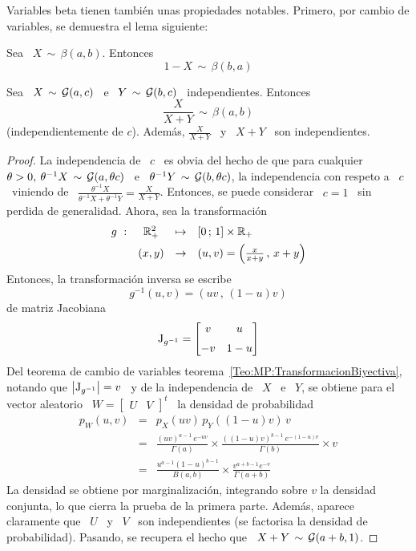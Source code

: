 Variables beta  tienen tambi\'en unas propiedades notables.  Primero, por cambio
de variables, se demuestra el lema siguiente:
%
\begin{lema}[Reflexividad]
\label{Lem:MP:ReflexividadBeta}
%
  Sea \ $X \, \sim \, \beta(a,b)$. Entonces
  \[
  1-X \, \sim \, \beta(b,a)
  \]
\end{lema}
%
\begin{lema}
\label{Lem:MP:VinculoBetaGamma}
%
  Sea  \   $X  \,  \sim  \,   \mathcal{G}(a,c)$  \  e  \   $Y  \,  \sim   \,  \mathcal{G}(b,c)$  \
  independientes. Entonces
  \[
  \frac{X}{X+Y} \, \sim \, \beta(a,b)
  \]
  (independientemente  de $c$).   Adem\'as, $\frac{X}{X+Y}$  \ y  \ $X+Y$  \ son
  independientes.
\end{lema}
%
\begin{proof}
  La independencia de \ $c$ \ es obvia del hecho de que para cualquier $\theta >
  0, \: \theta^{-1} X \, \sim \, \mathcal{G}(a,\theta c)$ \ e \ $\theta^{-1} Y \, \sim \,
  \mathcal{G}(b,\theta  c)$,  la independencia  con  respeto  a \  $c$  \  viniendo de  \
  $\frac{\theta^{-1}     X}{\theta^{-1}     X     +     \theta^{-1}     Y}     =
  \frac{X}{X+Y}$.  Entonces, se  puede considerar  \ $c  = 1$  \ sin  perdida de
  generalidad. Ahora, sea la transformaci\'on
  \[
  \begin{array}{lccl}
    g\ : & \mathbb{R}_+^2 & \mapsto & [0 \, ; \, 1] \times \mathbb{R}_+\\[1.5mm]
    & (x,y) & \to & (u,v) = \left( \frac{x}{x+y} \, , \, x+y \right)
  \end{array}
  \]
  Entonces, la transformaci\'on inversa se escribe
  \[
  g^{-1}(u,v) = \left( u v \, , \, (1-u) v \right)
  \]
  de matriz Jacobiana
  \[
  \operatorname{J}_{g^{-1}} = \begin{bmatrix} v & u \\[2mm] -v & 1-u \end{bmatrix}
  \]
  Del          teorema          de          cambio         de          variables
  teorema~\ref{Teo:MP:TransformacionBiyectiva},      notando     que     $\left|
    \operatorname{J}_{g^{-1}} \right| =  v$ \ y de la  independencia de \ $X$ \ e  \ $Y$, se
  obtiene para el vector aleatorio \ $W = \begin{bmatrix} U & V \end{bmatrix}^t$
  \ la densidad de probabilidad
  \begin{eqnarray*}
    p_W(u,v) & = & p_X( u v ) \, p_Y( (1-u) v ) \, v\\[2mm]
    & = & \frac{\left( u v \right)^{a-1} \, e^{- u v}}{\Gamma(a)} \times
    \frac{\left( (1-u) v \right)^{b-1} \, e^{- (1-u) v}}{\Gamma(b)} \times v\\[2mm]
    & = & \frac{u^{a-1} (1-u)^{b-1}}{B(a,b)} \times \frac{v^{a+b-1} e^{-v}}{\Gamma(a+b)}
  \end{eqnarray*}
  La  densidad se  obtiene por  marginalizaci\'on, \ie  integrando sobre  $v$ la
  densidad conjunta,  lo que  cierra la prueba  de la primera  parte.  Adem\'as,
  aparece claramente que \  $U$ \ y \ $V$ \ son  independientes (se factorisa la
  densidad de probabilidad).   Pasando, se recupera el hecho que  \ $X+Y \, \sim
  \, \mathcal{G}(a+b,1)$.
\end{proof}

